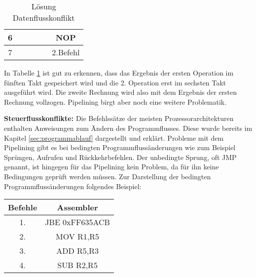\documentclass[12pt]{article}
\begin{document}
\begin{table}[!htb]
\begin{tabular}{|c|c|c|c|c|c|}
6    &                                                            &                                                              &                                                               & \cellcolor[HTML]{9AFF99}{\color[HTML]{333333} \textbf{2.Befehl}} & NOP                                                               \\ \hline
7    &                                                            &                                                              &                                                               &                                                                  & 2.Befehl                                                          \\ \hline
\end{tabular}
\caption{Lösung Datenflusskonflikt}
\label{tab:Datenflusskonfliktloesung}
\end{table}

\noindent In Tabelle \ref{tab:Datenflusskonfliktloesung} ist gut zu erkennen, dass das Ergebnis der ersten Operation im fünften Takt gespeichert wird und die 2. Operation erst im sechsten Takt ausgeführt wird. Die zweite Rechnung wird also mit dem Ergebnis der ersten Rechnung vollzogen. Pipelining birgt aber noch eine weitere Problematik.

\par\bigskip\noindent \textbf{Steuerflusskonflikte:} Die Befehlssätze der meisten Prozessorarchitekturen enthalten Anweisungen zum Ändern des Programmflusses. Diese wurde bereits im Kapitel \ref{sec:programmablauf} dargestellt und erklärt. Probleme mit dem Pipelining gibt es bei bedingten Programmflussänderungen wie zum Beispiel Sprüngen, Aufrufen und Rückkehrbefehlen. Der unbedingte Sprung, oft JMP genannt, ist hingegen für das Pipelining kein Problem, da für ihn keine Bedingungen geprüft werden müssen. Zur Darstellung der bedingten Programmflussänderungen folgendes Beispiel:


\begin{table}[!htb]
\centering
\begin{tabular}{|c|c|}
\hline
Befehle & Assembler      \\ \hline
1.      & JBE 0xFF635ACB \\ \hline
2.      & MOV R1,R5      \\ \hline
3.      & ADD R5,R3      \\ \hline
4.      & SUB R2,R5      \\ \hline
\end{tabular}
\end{table}
\end{document}
